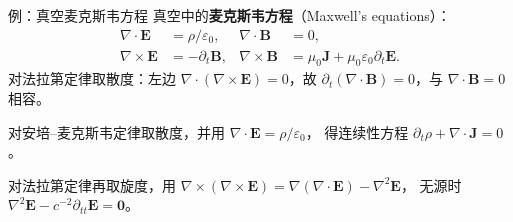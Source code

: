 \documentclass[fontset=windows, chinese, 10pt, xcolor=dvipsnames]{beamer}
\begin{document}
\begin{frame}{例：真空麦克斯韦方程}
  \footnotesize
  真空中的\textbf{麦克斯韦方程}（Maxwell's equations）：
  \begin{equation*}
  \begin{aligned}
    \nabla\cdot\mathbf{E}&=\rho/\varepsilon_0, &
    \nabla\cdot\mathbf{B}&=0,\\
    \nabla\times\mathbf{E}&=-\partial_t\mathbf{B}, &
    \nabla\times\mathbf{B}
    &=\mu_0\mathbf{J}+\mu_0\varepsilon_0\partial_t\mathbf{E}.
  \end{aligned}
  \end{equation*}
  对法拉第定律取散度：左边 $\nabla\cdot(\nabla\times\mathbf{E})=0$，故
  $\partial_t(\nabla\cdot\mathbf{B})=0$，与 $\nabla\cdot\mathbf{B}=0$ 相容。

  对安培--麦克斯韦定律取散度，并用 $\nabla\cdot\mathbf{E}=\rho/\varepsilon_0$，
  得连续性方程 $\partial_t\rho+\nabla\cdot\mathbf{J}=0$。

  对法拉第定律再取旋度，用
  $\nabla\times(\nabla\times\mathbf{E})=\nabla(\nabla\cdot\mathbf{E})-\nabla^2\mathbf{E}$，
  无源时 $\nabla^2\mathbf{E}-c^{-2}\partial_{tt}\mathbf{E}=\mathbf{0}$。
\end{frame}





\end{document}

